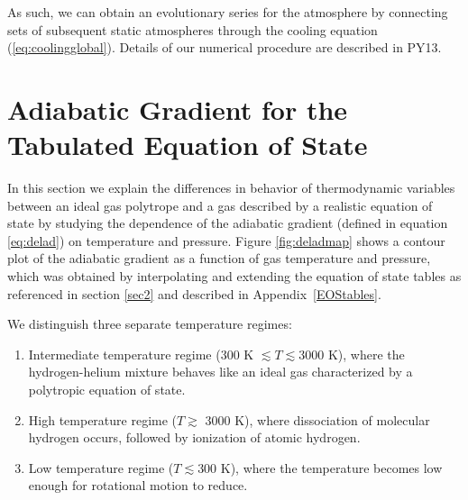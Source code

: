 \documentclass[apj]{emulateapj}
\newcommand{\delad}{\nabla_{\rm ad}}
\newcommand{\App}[1]{Appendix~\ref{#1}}
\begin{document}
As such, we can obtain an evolutionary series for the atmosphere by connecting sets of subsequent static atmospheres through the cooling equation (\ref{eq:coolingglobal}). Details of our numerical procedure are described in PY13.


\section{Adiabatic Gradient for the Tabulated Equation of State}
\label{deladtable}



In this section we explain the differences in behavior of thermodynamic variables between an ideal gas polytrope and a gas described by a realistic equation of state by studying the dependence of the adiabatic gradient (defined in equation \ref{eq:delad}) on temperature and pressure. Figure \ref{fig:deladmap} shows a contour plot of the adiabatic gradient as a function of gas temperature and pressure, which was obtained by interpolating and extending the \citet{saumon95} equation of state tables as referenced in section \ref{sec2} and described in \App{EOStables}.

We distinguish three separate temperature regimes:



\begin{enumerate}
\item Intermediate temperature regime (300 K $\lesssim T \lesssim 3000$ K), where the hydrogen-helium mixture behaves like an ideal gas characterized by a polytropic equation of state.
\item High temperature regime ($T \gtrsim$ 3000 K), where dissociation of molecular hydrogen occurs, followed by ionization of atomic hydrogen.
\item Low temperature regime ($T \lesssim 300$ K), where the temperature becomes low enough for rotational motion to reduce.
\end{enumerate}
\end{document}
